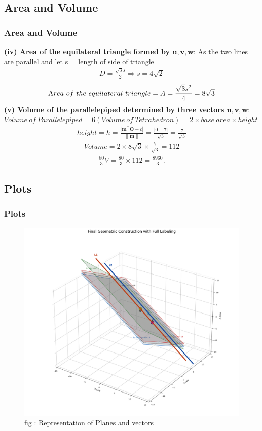 \documentclass{beamer}
\theoremstyle{remark}
\providecommand{\norm}[1]{\lVert#1\rVert}
\let\vec\mathbf
\numberwithin{equation}{section}
\begin{document}
\subsection{Area and Volume}
\begin{frame}
\frametitle{Area and Volume}
\textbf{(iv) Area of the equilateral triangle formed by $\vec{u},\vec{v},\vec{w}$}:
As the two lines are parallel and let s = length of side of triangle
\begin{align}
D = \frac{\sqrt{3}s}{2} \Longrightarrow s = 4\sqrt{2}
\end{align}
\begin{align}
\text Area \ of\ the\ equilateral\ triangle = A = \frac{\sqrt{3}s^2}{4} = 8\sqrt{3} 
\end{align}
\textbf{(v) Volume of the parallelepiped determined by three vectors $\vec{u},\vec{v},\vec{w}$}:
$Volume\ of\ Parallelepiped = 6(Volume\ of\ Tetrahedron) = 2\times base\ area\times height$
\begin{align}
height=h=\frac{|\vec{m}^\top\vec{O}-c|}{\norm{\vec{m}}}=\frac{|0-7|}{\sqrt{3}}=\frac{7}{\sqrt{3}}
\end{align}
\begin{align}
Volume = 2\times8\sqrt{3}\times\frac{7}{\sqrt{3}} = 112
\end{align}
\begin{align}
\frac{80}{3}V = \frac{80}{3}\times 112 = \frac{8960}{3}.
\end{align}
\end{frame}
\subsection{Plots}
\begin{frame}
\frametitle{Plots}
\begin{figure}
\centering
\includegraphics[width=0.8\columnwidth]{figs/fig5_.png}
\caption{fig : Representation of Planes and vectors}
\label{Fig5}
\end{figure}
\end{frame}
\end{document}
